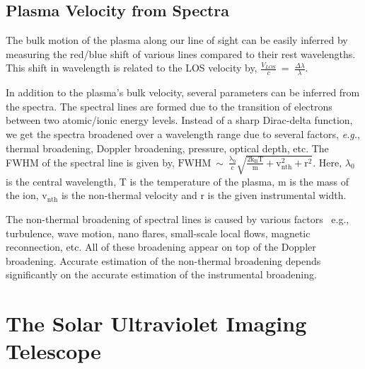 {%
\subsection{Plasma Velocity from Spectra}

The bulk motion of the plasma along our line of sight can be easily inferred by measuring the red/blue shift of various lines compared to their rest wavelengths. This shift in wavelength is related to the LOS velocity by, $\frac{V_{LOS}}{c}~=~\frac{\Delta \lambda}{\lambda}$.

In addition to the plasma's bulk velocity, several parameters can be inferred from the spectra. The spectral lines are formed due to the transition of electrons between two atomic/ionic energy levels. Instead of a sharp Dirac-delta function, we get the spectra broadened over a wavelength range due to several factors, {\it e.g.}, thermal broadening, Doppler broadening, pressure, optical depth, etc. The FWHM of the spectral line is given by, $\mathrm{FWHM~\sim~\frac{\lambda_{0}}{c}\sqrt{\frac{2k_{B}T}{m}+v_{nth}^{2}+r^{2}}}$. Here, $\lambda_{0}$ is the central wavelength, T is the temperature of the plasma, m is the mass of the ion, $\mathrm{v_{nth}}$ is the non-thermal velocity and r is the given instrumental width. 

The non-thermal broadening of spectral lines is caused by various factors {\, e.g.}, turbulence, wave motion, nano flares, small-scale local flows, magnetic reconnection, etc. All of these broadening appear on top of the Doppler broadening. Accurate estimation of the non-thermal broadening depends significantly on the accurate estimation of the instrumental broadening.

\section{The Solar Ultraviolet Imaging Telescope}\label{sec:suit}

}
